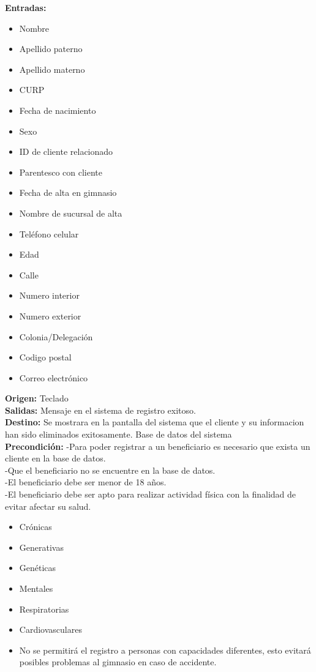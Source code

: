 \textbf{Entradas: }
        \begin{itemize}
         \item Nombre
         \item Apellido paterno
         \item Apellido materno
         \item CURP
         \item Fecha de nacimiento
         \item Sexo
         \item ID de cliente relacionado
         \item Parentesco con cliente
         \item Fecha de alta en gimnasio
         \item Nombre de sucursal de alta 
         \item Teléfono celular
         \item Edad 
         \item Calle 
         \item Numero interior 
         \item Numero exterior 
         \item Colonia/Delegación
         \item Codigo postal
         \item Correo electrónico
\end{itemize}
\textbf{Origen:} Teclado\\
\textbf{Salidas:} Mensaje en el sistema de registro exitoso.\\
\textbf{Destino:} Se mostrara en la pantalla del sistema que el cliente y su informacion han sido eliminados exitosamente. Base de datos del sistema\\
\textbf{Precondición: }
-Para poder registrar a un beneficiario es necesario que exista un cliente en la base de datos.\\ 
-Que el beneficiario no se encuentre en la base de datos.\\
-El beneficiario debe ser menor de 18 años.\\
-El beneficiario debe ser apto para realizar actividad física con la finalidad de evitar  afectar su salud.\\
\begin{itemize}
	\item Crónicas
	\item Generativas
	\item Genéticas
	\item Mentales
	\item Respiratorias
	\item Cardiovasculares
	\item No se permitirá el registro a personas con capacidades diferentes, esto evitará posibles problemas al gimnasio en caso de accidente.
\end{itemize}

